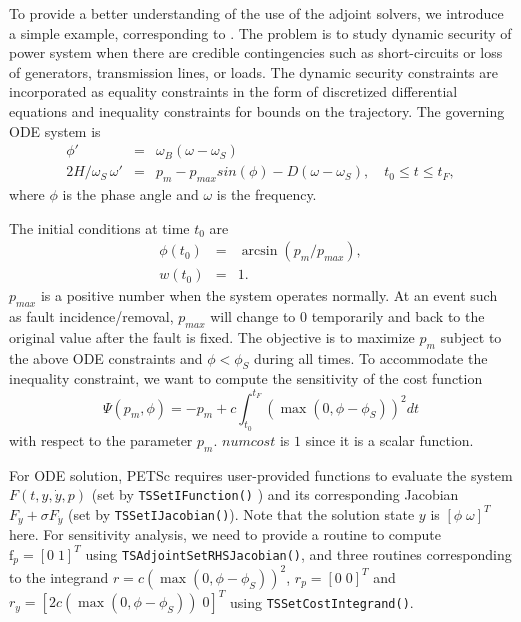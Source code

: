 {To provide a better understanding of the use of the adjoint solvers, we introduce a simple example, corresponding to \href{http://www.mcs.anl.gov/petsc/petsc-current/src/ts/examples/tutorials/power_grid/ex3adj.c.html}{}.
The problem is to study dynamic security of power system when there are credible contingencies such as short-circuits or loss of generators, transmission lines, or loads.
The dynamic security constraints are incorporated as equality constraints in the form of discretized differential equations and inequality constraints for bounds on the trajectory.
The governing ODE system is
\begin{eqnarray*}
    \phi' &= &\omega_B (\omega - \omega_S)  \\
    2H/\omega_S \, \omega' & =& p_m - p_{max} sin(\phi) -D (\omega - \omega_S), \quad t_0 \leq t \leq t_F,
\end{eqnarray*}
where $\phi$ is the phase angle and $\omega$ is the frequency.

The initial conditions at time $t_0$ are
%
\begin{eqnarray*}
\phi(t_0) &=& \arcsin \left( p_m / p_{max} \right), \\
w(t_0) & =& 1.
\end{eqnarray*}
%
$p_{max}$ is a positive number when the system operates normally. At an event such as fault incidence/removal, $p_{max}$ will change to $0$ temporarily and back to the original value after the fault is fixed.
The objective is to maximize $p_m$ subject to the above ODE constraints and $\phi<\phi_S$ during all times.
To accommodate the inequality constraint, we want to compute the sensitivity of the cost function
%
\[
\Psi(p_m,\phi) = -p_m + c \int_{t_0}^{t_F} \left( \max(0, \phi - \phi_S ) \right)^2 dt
\]
%
with respect to the parameter $p_m$. $numcost$ is $1$ since it is a scalar function.

For ODE solution, PETSc requires user-provided functions to evaluate the system $F(t,y,\dot{y},p)$ (set by \lstinline{TSSetIFunction()} )
and its corresponding Jacobian $F_y + \sigma F_{\dot y}$ (set by \lstinline{TSSetIJacobian()}).
Note that the solution state $y$ is $[ \phi \;  \omega ]^T$ here.
For sensitivity analysis, we need to provide a routine to compute $\mathrm{f}_p=[0 \; 1]^T$ using \lstinline{TSAdjointSetRHSJacobian()},
and three routines corresponding to the integrand $r=c \left( \max(0, \phi - \phi_S ) \right)^2$, $r_p = [0 \; 0]^T$ and $r_y= [ 2 c \left( \max(0, \phi - \phi_S ) \right) \; 0]^T$ using \lstinline{TSSetCostIntegrand()}.

}
